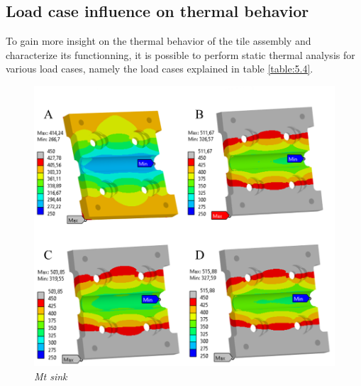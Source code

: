 \subsection{Load case influence on thermal behavior}
\normalsize{To gain more insight on the thermal behavior of the tile assembly and characterize its functionning, it is possible to perform static thermal analysis for various load cases, namely the load cases explained in table \ref{table:5.4}. }
\\
\begin{figure}[h!]
    \label{fig_5_10} 
    \centering
    \includegraphics[width=1\textwidth]{figures/loadcasestaticthermalHSTF.png}
    \caption{\it Mt sink}
\end{figure}